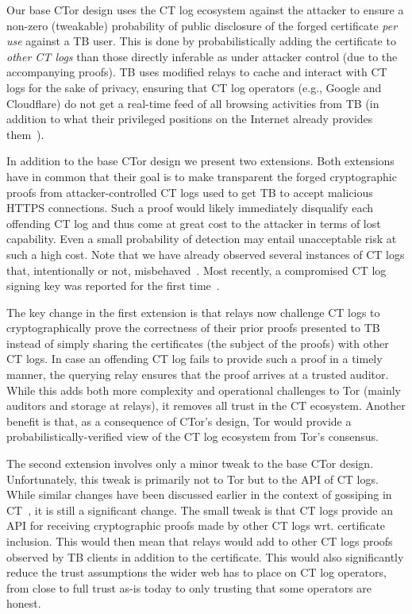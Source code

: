 Our base CTor design uses the CT log ecosystem against the attacker to ensure a
non-zero (tweakable) probability of public disclosure of the forged certificate
\emph{per use} against a TB user. This is done by probabilistically adding the
certificate to \emph{other CT logs} than those directly inferable as under
attacker control (due to the accompanying proofs). TB uses modified relays to
cache and interact with CT logs for the sake of privacy, ensuring that CT log
operators (e.g., Google and Cloudflare) do not get a real-time feed of all
browsing activities from TB (in addition to what their privileged positions on
the Internet already provides them~\cite{1mtrack,TorDNS}).

In addition to the base CTor design we present two extensions. Both extensions
have in common that their goal is to make transparent the forged cryptographic
proofs from attacker-controlled CT logs used to get TB to accept malicious HTTPS
connections. Such a proof would likely immediately disqualify each offending CT
log and thus come at great cost to the attacker in terms of lost capability.
Even a small probability of detection may entail unacceptable risk at such a
high cost. Note that we have already observed several instances of CT logs that,
intentionally or not,
misbehaved~\cite{izenpe-disqualified,venafi-disqualified,gdca1-omission}. Most
recently, a compromised CT log signing key was reported for the first
time~\cite{digicert-log-compromised}. 

The key change in the first extension is that relays now challenge CT logs to
cryptographically prove the correctness of their prior proofs presented to TB
instead of simply sharing the certificates (the subject of the proofs) with
other CT logs. In case an offending CT log fails to provide such a proof in a
timely manner, the querying relay ensures that the proof arrives at a trusted
auditor. While this adds both more complexity and operational challenges to Tor
(mainly auditors and storage at relays), it removes all trust in the CT
ecosystem. Another benefit is that, as a consequence of CTor's design, Tor would
provide a probabilistically-verified view of the CT log ecosystem from Tor's
consensus.

The second extension involves only a minor tweak to the base CTor design.
Unfortunately, this tweak is primarily not to Tor but to the API of CT logs.
While similar changes have been discussed earlier in the context of gossiping in
CT~\cite{minimal-gossip}, it is still a significant change. The small tweak
is that CT logs provide an API for receiving cryptographic proofs made by other
CT logs wrt. certificate inclusion. This would then mean that relays would add
to other CT logs proofs observed by TB clients in addition to the certificate.
This would also significantly reduce the trust assumptions the wider web has to
place on CT log operators, from close to full trust as-is today to only trusting
that some operators are honest.

